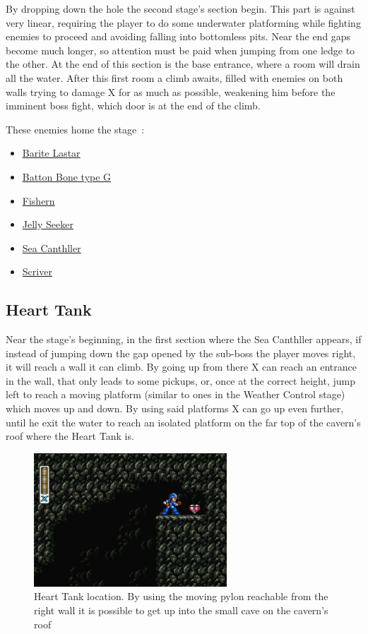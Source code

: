 By dropping down the hole the second stage's section begin. This part is against very linear, requiring the player to do some underwater platforming while fighting enemies to proceed and avoiding falling into bottomless pits. Near the end gaps become much longer, so attention must be paid when jumping from one ledge to the other. At the end of this section is the base entrance, where a room will drain all the water. After this first room a climb awaits, filled with enemies on both walls trying to damage X for as much as possible, weakening him before the imminent boss fight, which door is at the end of the climb.

These enemies home the stage~\cite{wiki:Deep_sea}:
\begin{itemize}
		\item \hyperlink {enem:Barite_Lastar}{Barite Lastar}
		\item \hyperlink {enem:Batton_Bone_type_G}{Batton Bone type G}
		\item \hyperlink {enem:Fishern}{Fishern}
		\item \hyperlink {enem:Jelly_Seeker}{Jelly Seeker}
		\item \hyperlink {miniboss:Sea_Canthller}{Sea Canthller}
		\item \hyperlink {enem:Scriver}{Scriver}
\end{itemize}

\subsection{Heart Tank}
Near the stage's beginning, in the first section where the Sea Canthller appears, if instead of jumping down the gap opened by the sub-boss the player moves right, it will reach a wall it can climb. By going up from there X can reach an entrance in the wall, that only leads to some pickups, or, once at the correct height, jump left to reach a moving platform (similar to ones in the Weather Control stage) which moves up and down. By using said platforms X can go up even further, until he exit the water  to reach an isolated platform on the far top of the cavern's roof where the Heart Tank is.
\begin{figure}[htp]
	\centering
	\includegraphics[height=5cm]{figures/X2/Bubble_crab/Crab_heart.png}
	\caption{Heart Tank location. By using the moving pylon reachable from the right wall it is possible to get up into the small cave on the cavern's roof}
\end{figure}
